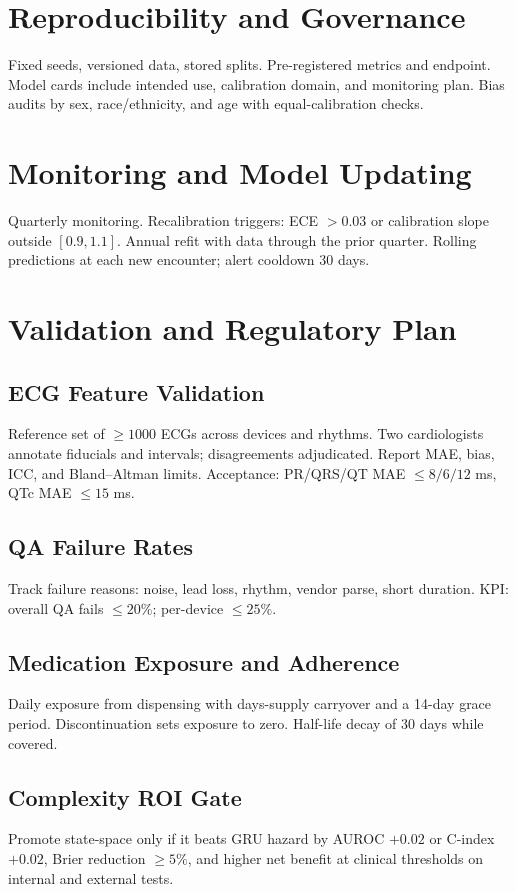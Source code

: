 \documentclass[11pt]{article}
\begin{document}
\section{Reproducibility and Governance}
Fixed seeds, versioned data, stored splits. Pre-registered metrics and endpoint. Model cards include intended use, calibration domain, and monitoring plan. Bias audits by sex, race/ethnicity, and age with equal-calibration checks.

\section{Monitoring and Model Updating}
Quarterly monitoring. Recalibration triggers: ECE $>0.03$ or calibration slope outside $[0.9,1.1]$. Annual refit with data through the prior quarter. Rolling predictions at each new encounter; alert cooldown 30 days.

\section{Validation and Regulatory Plan}
\subsection{ECG Feature Validation}
Reference set of $\geq 1000$ ECGs across devices and rhythms. Two cardiologists annotate fiducials and intervals; disagreements adjudicated. Report MAE, bias, ICC, and Bland--Altman limits. Acceptance: PR/QRS/QT MAE $\leq 8/6/12$ ms, QTc MAE $\leq 15$ ms.

\subsection{QA Failure Rates}
Track failure reasons: noise, lead loss, rhythm, vendor parse, short duration. KPI: overall QA fails $\leq 20\%$; per-device $\leq 25\%$.

\subsection{Medication Exposure and Adherence}
Daily exposure from dispensing with days-supply carryover and a 14-day grace period. Discontinuation sets exposure to zero. Half-life decay of 30 days while covered.

\subsection{Complexity ROI Gate}
Promote state-space only if it beats GRU hazard by AUROC $+0.02$ or C-index $+0.02$, Brier reduction $\geq 5\%$, and higher net benefit at clinical thresholds on internal and external tests.
\end{document}
